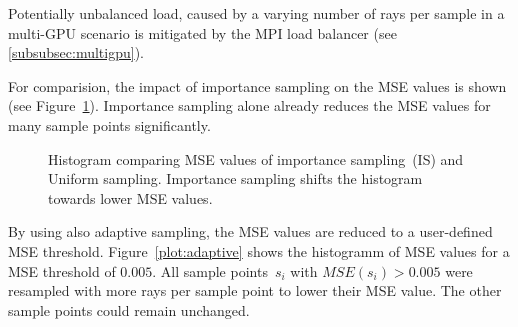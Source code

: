 Potentially unbalanced load, caused by a varying number of rays per sample 
in a multi-GPU scenario is mitigated by the MPI load balancer (see \cref{subsubsec:multigpu}).

For comparision, the impact of importance sampling
on the MSE values is shown (see Figure~\ref{plot:importance2}). 
Importance sampling alone already reduces the MSE values for
many sample points significantly.
\begin{figure}[H]
  \centerline{
    }
  \caption{Histogram comparing MSE values of importance sampling~(IS)
    and Uniform sampling. Importance sampling shifts the histogram
    towards lower MSE values. }
  \label{plot:importance2}
\end{figure}
By using also adaptive sampling, the MSE values are reduced to a user-defined MSE threshold.
Figure~\ref{plot:adaptive} shows the histogramm of MSE values for a MSE threshold
of $0.005$. All sample points~$s_i$ with $MSE(s_i) > 0.005$ were resampled with more rays
per sample point to lower their MSE value. The other sample points could remain unchanged.
